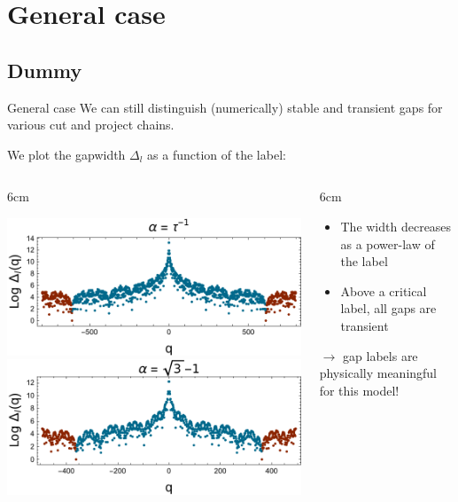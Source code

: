 \documentclass[xcolor=x11names,compress,professionalfonts]{beamer}
\renewcommand{\(}{\begin{columns}}
\renewcommand{\)}{\end{columns}}
\newcommand{\<}[1]{\begin{column}{#1}}
\renewcommand{\>}{\end{column}}
\begin{document}
\section{General case}
\subsection{Dummy}
\begin{frame}{General case}
We can still distinguish (numerically) stable and transient gaps for various cut and project chains.

We plot the gapwidth $\Delta_l$ as a function of the label:

\(
\<{6cm}
{\centering
\newcommand{\s}{.45}
\includegraphics[scale=\s]{img/loggapwidth_fibonacci_l_17.pdf}\\
\includegraphics[scale=\s]{img/loggapwidth_sqrt3_l_12.pdf}

}
\>
\<{6cm}
\begin{itemize}
	\item The width decreases as a power-law of the label
	\item Above a critical label, all gaps are transient
\end{itemize}
$\rightarrow$ gap labels are physically meaningful for this model!
\>
\)
	
\end{frame}
\end{document}
